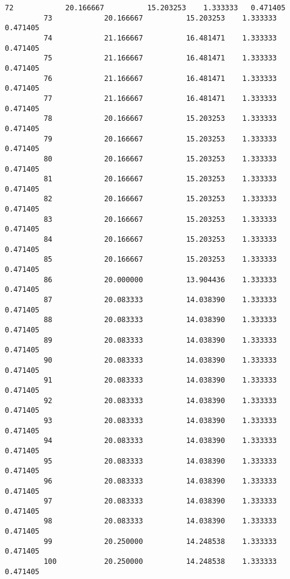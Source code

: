 \documentclass[11pt]{article}
\begin{document}
\begin{Verbatim}[commandchars=\\\{\}]
         72            20.166667          15.203253    1.333333   0.471405   
         73            20.166667          15.203253    1.333333   0.471405   
         74            21.166667          16.481471    1.333333   0.471405   
         75            21.166667          16.481471    1.333333   0.471405   
         76            21.166667          16.481471    1.333333   0.471405   
         77            21.166667          16.481471    1.333333   0.471405   
         78            20.166667          15.203253    1.333333   0.471405   
         79            20.166667          15.203253    1.333333   0.471405   
         80            20.166667          15.203253    1.333333   0.471405   
         81            20.166667          15.203253    1.333333   0.471405   
         82            20.166667          15.203253    1.333333   0.471405   
         83            20.166667          15.203253    1.333333   0.471405   
         84            20.166667          15.203253    1.333333   0.471405   
         85            20.166667          15.203253    1.333333   0.471405   
         86            20.000000          13.904436    1.333333   0.471405   
         87            20.083333          14.038390    1.333333   0.471405   
         88            20.083333          14.038390    1.333333   0.471405   
         89            20.083333          14.038390    1.333333   0.471405   
         90            20.083333          14.038390    1.333333   0.471405   
         91            20.083333          14.038390    1.333333   0.471405   
         92            20.083333          14.038390    1.333333   0.471405   
         93            20.083333          14.038390    1.333333   0.471405   
         94            20.083333          14.038390    1.333333   0.471405   
         95            20.083333          14.038390    1.333333   0.471405   
         96            20.083333          14.038390    1.333333   0.471405   
         97            20.083333          14.038390    1.333333   0.471405   
         98            20.083333          14.038390    1.333333   0.471405   
         99            20.250000          14.248538    1.333333   0.471405   
         100           20.250000          14.248538    1.333333   0.471405   
         

\end{Verbatim}
\end{document}
